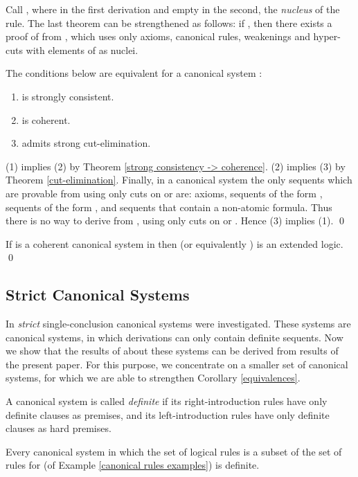 \documentclass{LMCS}
\theoremstyle{remark}
\newcommand{\be}{\begin{enumerate}[(1)]}
\newcommand{\ee}{\end{enumerate}}
\begin{document}
\begin{enumerate}[(a)]
\begin{enumerate}[\bf(a):]
\begin{rem}
Call , where  in the 
first derivation and empty in the second,
the {\em nucleus} of the rule.
The last theorem can be strengthened as follows:
if ,
then there exists a proof of  from ,
which uses only axioms, canonical rules,
weakenings and hyper-cuts with elements of  as nuclei.
\end{rem}

\begin{cor}
\label{equivalences}
The conditions below are equivalent for a 
canonical system :
\be
\item  is strongly consistent.
\item  is coherent.
\item  admits strong cut-elimination.
\ee
\end{cor}
\proof
(1) implies (2) by Theorem \ref{strong consistency -> coherence}. 
(2) implies (3) by Theorem \ref{cut-elimination}. 
Finally, in a canonical system
the only sequents which are provable from 
 using only cuts on  or  are: 
axioms, sequents of the form ,
sequents of the form , and sequents that contain a non-atomic formula.
Thus there is no way to derive  from ,
using only cuts on  or . Hence (3) implies (1).
\qed

\begin{cor}
If  is a coherent canonical system in  then 
 (or equivalently ) is an extended logic.
\qed
\end{cor}

\subsection{Strict Canonical Systems}

In \cite{AL10} {\em strict} single-conclusion canonical systems were investigated.
These systems are canonical systems,
in which derivations can only contain definite sequents.
Now we show that the results of \cite{AL10} about these systems 
can be derived from results of the present paper.
For this purpose, we concentrate on a smaller set of canonical systems, 
for which we are able to strengthen Corollary \ref{equivalences}.

\begin{defi}
\label{definite system}
A canonical system is called {\em definite} 
if its right-introduction rules have only definite clauses as premises,
and its left-introduction rules have only definite clauses as hard premises.
\end{defi}

\begin{exa}
Every canonical system in which the set of logical rules is a subset of the set of rules 
for  (of Example \ref{canonical rules examples}) is definite.
\end{exa}


\end{enumerate}
\end{enumerate}
\end{document}

